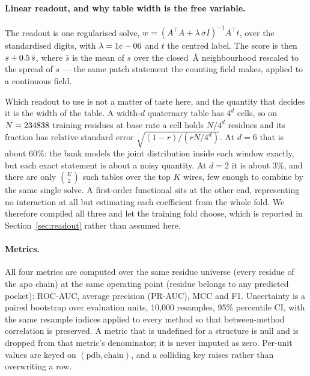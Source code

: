 \documentclass[11pt]{article}
\begin{document}
\paragraph{Linear readout, and why table width is the free variable.} The readout
is one regularised solve, \(w=(A^{\top}A+\lambda\,\bar{\sigma}I)^{-1}A^{\top}t\),
over the standardised digits, with \(\lambda=1e-06{}\) and \(t\) the centred
label. The score is then \(s+0.5{}\,\bar{s}\), where \(\bar{s}\) is
the mean of \(s\) over the closed \LinGateRadius{}\,\AA{} neighbourhood rescaled
to the spread of \(s\) --- the same patch statement the counting field makes,
applied to a continuous field.

Which readout to use is not a matter of taste here, and the quantity that decides
it is the width of the table. A width-\(d\) quaternary table has \(4^{d}\) cells,
so on \(N=234838{}\) training residues at base rate \TrainRate{} a cell
holds \(N/4^{d}\) residues and its fraction has relative standard error
\(\sqrt{(1-r)/(rN/4^{d})}\). At \(d=6\) that is about 60\%: the bank models the
joint distribution inside each window exactly, but each exact statement is about
a noisy quantity. At \(d=2\) it is about 3\%, and there are only \(\binom{K}{2}\)
such tables over the top \(K\) wires, few enough to combine by the same single
solve. A first-order functional sits at the other end, representing no
interaction at all but estimating each coefficient from the whole fold. We
therefore compiled all three and let the training fold choose, which is reported
in Section~\ref{sec:readout} rather than assumed here.

\paragraph{Metrics.} All four metrics are computed over the same residue universe
(every residue of the apo chain) at the same operating point (residue belongs to
any predicted pocket): ROC-AUC, average precision (PR-AUC), MCC and F1.
Uncertainty is a paired bootstrap over evaluation units, 10{,}000 resamples, 95\%
percentile CI, with the same resample indices applied to every method so that
between-method correlation is preserved. A metric that is undefined for a
structure is null and is dropped from that metric's denominator; it is never
imputed as zero. Per-unit values are keyed on \((\text{pdb},\text{chain})\), and a
colliding key raises rather than overwriting a row.
\end{document}
